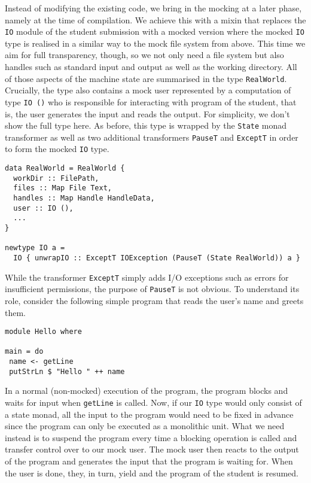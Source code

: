Instead of modifying the existing code, we bring in the mocking at a later phase, namely at the time of compilation.
We achieve this with a mixin that replaces the \texttt{IO} module of the student submission with a mocked version where the mocked \texttt{IO} type is realised in a similar way to the mock file system from above.
This time we aim for full transparency, though, so we not only need a file system but also handles such as standard input and output as well as the working directory.
All of those aspects of the machine state are summarised in the type \texttt{RealWorld}.
Crucially, the type also contains a mock user represented by a computation of type \texttt{IO ()} who is responsible for interacting with program of the student, that is, the user generates the input and reads the output.
For simplicity, we don't show the full type here.
As before, this type is wrapped by the \texttt{State} monad transformer as well as two additional transformers \texttt{PauseT} and \texttt{ExceptT} in order to form the mocked \texttt{IO} type.
\begin{verbatim}
data RealWorld = RealWorld {
  workDir :: FilePath,
  files :: Map File Text,
  handles :: Map Handle HandleData,
  user :: IO (),
  ...
}

newtype IO a =
  IO { unwrapIO :: ExceptT IOException (PauseT (State RealWorld)) a }
\end{verbatim}
While the transformer \texttt{ExceptT} simply adds I/O exceptions such as errors for insufficient permissions, the purpose of \texttt{PauseT} is not obvious.
To understand its role, consider the following simple program that reads the user's name and greets them.
\begin{verbatim}
module Hello where

main = do
 name <- getLine
 putStrLn $ "Hello " ++ name
\end{verbatim}
In a normal (non-mocked) execution of the program, the program blocks and waits for input when \texttt{getLine} is called.
Now, if our \texttt{IO} type would only consist of a state monad, all the input to the program would need to be fixed in advance since the program can only be executed as a monolithic unit.
What we need instead is to suspend the program every time a blocking operation is called and transfer control over to our mock user.
The mock user then reacts to the output of the program and generates the input that the program is waiting for.
When the user is done, they, in turn, yield and the program of the student is resumed.

